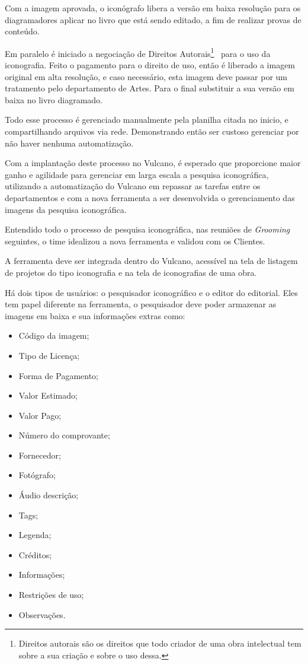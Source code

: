 \documentclass[
  12pt,				%
  openany,
  oneside,
  a4paper,			%
  english,			%
  brazil
]{article}
\numberwithin{figure}{section}
\numberwithin{table}{section}
\newcounter{subsubsubsection}[subsubsection]
\begin{document}
Com a imagem aprovada, o iconógrafo libera a versão em baixa resolução para os diagramadores aplicar no livro que está sendo editado, a fim de realizar provas de conteúdo.

Em paralelo é iniciado a negociação de Direitos Autorais\footnote{Direitos autorais são os direitos que todo criador de uma obra intelectual tem sobre a sua criação e sobre o uso dessa.}~\cite{SEBRAE_DA} para o uso da iconografia. Feito o pagamento para o direito de uso, então é liberado a imagem original em alta resolução, e caso necessário, esta imagem deve passar por um tratamento pelo departamento de Artes. Para o final substituir a sua versão em baixa no livro diagramado.


Todo esse processo é gerenciado manualmente pela planilha citada no inicio, e compartilhando arquivos via rede. Demonstrando então ser custoso gerenciar por não haver nenhuma automatização. 

Com a implantação deste processo no Vulcano, é esperado que proporcione maior ganho e agilidade para gerenciar em larga escala a pesquisa iconográfica, utilizando a automatização do Vulcano em repassar as tarefas entre os departamentos e com a nova ferramenta a ser desenvolvida o gerenciamento das imagens da pesquisa iconográfica.



Entendido todo o processo de pesquisa iconográfica, nas reuniões de \textit{Grooming} seguintes, o time idealizou a nova ferramenta e validou com os Clientes.

A ferramenta deve ser integrada dentro do Vulcano, acessível na tela de listagem de projetos do tipo iconografia e na tela de iconografias de uma obra.

Há dois tipos de usuários: o pesquisador iconográfico e o editor do editorial. Eles tem papel diferente na ferramenta, o pesquisador deve poder armazenar as imagens em baixa e sua informações extras como:

\vspace{-10mm}
\begin{singlespace}
	\begin{itemize}
		\item Código da imagem;
		\item Tipo de Licença;
		\item Forma de Pagamento;
		\item Valor Estimado;
		\item Valor Pago;
		\item Número do comprovante;
		\item Fornecedor;
		\item Fotógrafo;
		\item Áudio descrição;
		\item Tags;
		\item Legenda;
		\item Créditos;
		\item Informações;
		\item Restrições de uso;
		\item Observações.
	\end{itemize}
\end{singlespace}
\vspace{-5mm}
\end{document}
